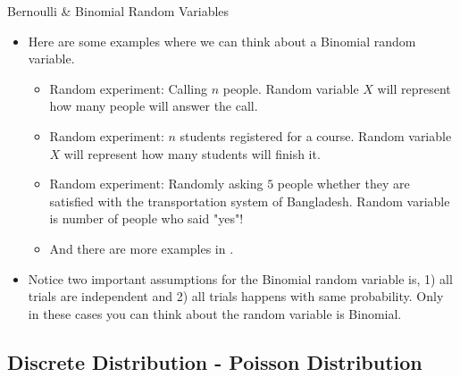 \documentclass[8pt, usepdftitle=false]{beamer}
\begin{document}
\begin{frame}[allowframebreaks]{Bernoulli \& Binomial Random Variables}
\begin{itemize}
\item Here are some examples where we can think about a Binomial random variable.

\begin{itemize}
\item  Random experiment: Calling $n$ people. Random variable $X$ will represent how many people will answer the call.

\item Random experiment: $n$ students registered for a course. Random variable $X$ will represent how many students will finish it.

\item Random experiment: Randomly asking $5$ people whether they are satisfied with the transportation system of Bangladesh. Random variable is number of people who said "yes"! 

\item And there are more examples in \cite{anderson_statistics_2020}.


\end{itemize}

\item Notice two important assumptions for the Binomial random variable is, 1) all trials are independent and 2) all trials happens with same probability. Only in these cases you can think about the random variable is Binomial.



\end{itemize}


\end{frame}



\subsection{Discrete Distribution - Poisson Distribution}
\frame{\subsectionpage}
\end{document}
